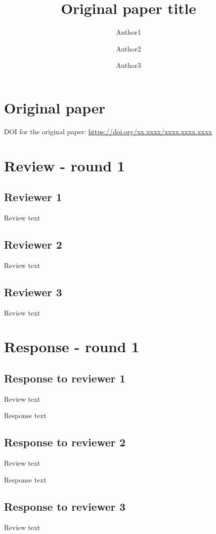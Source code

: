\documentclass[
  manuscript=editorial,
  layout=publish,
  year=20xx,
  volume=x,
]{extra/review}
\title{
Original paper title
}
\author{Author1}
\author{Author2}
\author{Author3}
\begin{document}
\section{Original paper}


DOI for the original paper: \url{https://doi.org/xx.xxxx/xxxx.xxxx.xxxx}


\section{Review - round 1}

\subsection{Reviewer 1}
Review text

\subsection{Reviewer 2}
Review text

\subsection{Reviewer 3}
Review text

\section{Response - round 1}

\subsection{Response to reviewer 1}
Review text

\begin{response}
Response text
\end{response}

\subsection{Response to reviewer 2}
Review text

\begin{response}
Response text
\end{response}


\subsection{Response to reviewer 3}
Review text
\end{document}
